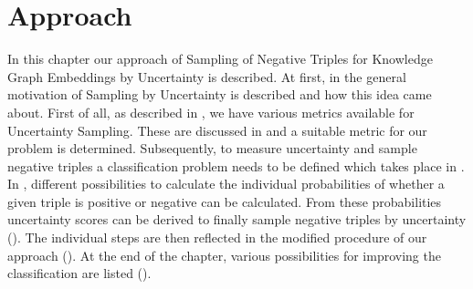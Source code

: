 \chapter{Approach}
\label{ch:approach}

In this chapter our approach of Sampling of Negative Triples for Knowledge Graph Embeddings by Uncertainty is described.
At first, in  the general motivation of Sampling by Uncertainty is described and how this idea came about.
First of all, as described in , we have various metrics available for Uncertainty Sampling.
These are discussed in  and a suitable metric for our problem is determined.
Subsequently, to measure uncertainty and sample negative triples a classification problem needs to be defined which takes place in .
In , different possibilities to calculate the individual probabilities of whether a given triple is positive or negative can be calculated.
From these probabilities uncertainty scores can be derived to finally sample negative triples by uncertainty ().
The individual steps are then reflected in the modified procedure of our approach ().
At the end of the chapter, various possibilities for improving the classification are listed ().














